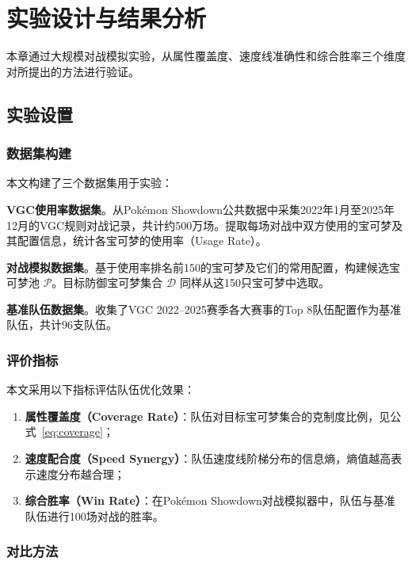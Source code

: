 \chapter{实验设计与结果分析}\label{chap:expt}

本章通过大规模对战模拟实验，从属性覆盖度、速度线准确性和综合胜率三个维度对所提出的方法进行验证。

\section{实验设置}

\subsection{数据集构建}

本文构建了三个数据集用于实验：

\textbf{VGC使用率数据集}。从Pokémon Showdown公共数据中采集2022年1月至2025年12月的VGC规则对战记录，共计约500万场。提取每场对战中双方使用的宝可梦及其配置信息，统计各宝可梦的使用率（Usage Rate）。

\textbf{对战模拟数据集}。基于使用率排名前150的宝可梦及它们的常用配置，构建候选宝可梦池 $\mathcal{P}$。目标防御宝可梦集合 $\mathcal{D}$ 同样从这150只宝可梦中选取。

\textbf{基准队伍数据集}。收集了VGC 2022--2025赛季各大赛事的Top 8队伍配置作为基准队伍，共计96支队伍。

\subsection{评价指标}

本文采用以下指标评估队伍优化效果：

\begin{enumerate}
    \item \textbf{属性覆盖度（Coverage Rate）}：队伍对目标宝可梦集合的克制度比例，见公式~\eqref{eq:coverage}；
    \item \textbf{速度配合度（Speed Synergy）}：队伍速度线阶梯分布的信息熵，熵值越高表示速度分布越合理；
    \item \textbf{综合胜率（Win Rate）}：在Pokémon Showdown对战模拟器中，队伍与基准队伍进行100场对战的胜率。
\end{enumerate}

\subsection{对比方法}

